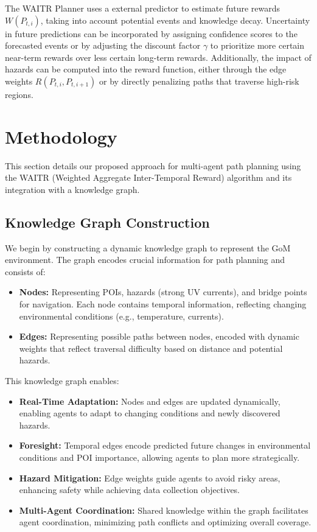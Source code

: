 \documentclass[conference]{IEEEtran}
\begin{document}
The WAITR Planner uses a external predictor to estimate future rewards \(W(P_{t,i})\), taking into account potential events and knowledge decay. Uncertainty in future predictions can be incorporated by assigning confidence scores to the forecasted events or by adjusting the discount factor \(\gamma\) to prioritize more certain near-term rewards over less certain long-term rewards. Additionally, the impact of hazards can be computed into the reward function, either through the edge weights \(R(P_{t,i}, P_{t,i+1})\) or by directly penalizing paths that traverse high-risk regions. 



\section{Methodology}

This section details our proposed approach for multi-agent path planning using the WAITR (Weighted Aggregate Inter-Temporal Reward) algorithm and its integration with a knowledge graph.

\subsection{Knowledge Graph Construction}

We begin by constructing a dynamic knowledge graph to represent the GoM environment. The graph encodes crucial information for path planning and consists of:

\begin{itemize}
    \item \textbf{Nodes:} Representing POIs, hazards (strong UV currents), and bridge points for navigation. Each node contains temporal information, reflecting changing environmental conditions (e.g., temperature, currents).
    \item \textbf{Edges:} Representing possible paths between nodes, encoded with dynamic weights that reflect traversal difficulty based on distance and potential hazards. 
\end{itemize}

This knowledge graph enables:

\begin{itemize}
    \item \textbf{Real-Time Adaptation:}  Nodes and edges are updated dynamically, enabling agents to adapt to changing conditions and newly discovered hazards.
    \item \textbf{Foresight:} Temporal edges encode predicted future changes in environmental conditions and POI importance, allowing agents to plan more strategically.
    \item \textbf{Hazard Mitigation:}  Edge weights guide agents to avoid risky areas, enhancing safety while achieving data collection objectives.
    \item \textbf{Multi-Agent Coordination:}  Shared knowledge within the graph facilitates agent coordination, minimizing path conflicts and optimizing overall coverage.
\end{itemize}
\end{document}
